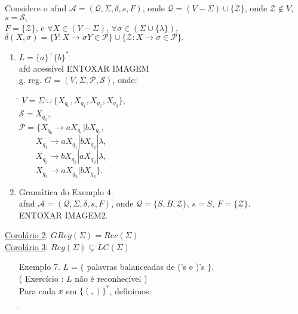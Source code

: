 \documentclass{article}
\newcommand{\gram}[1]{G_{#1} = (V_{#1},\Sigma,\mathcal{P}_{#1},\mathcal{S})}
\newcommand{\afnd}{\mathcal{A} = (\mathcal{Q},\Sigma, \delta, s, F)}
\begin{document}
    Considere o afnd $\afnd$, onde $ \mathcal{Q} = (V-\Sigma) \cup \{\mathcal{Z}\}$, onde $ \mathcal{Z} \notin V $, \\
    $ s = \mathcal{S}, $ \\
    $ F = \{\mathcal{Z}\} $,
    e $ \forall X \in (V-\Sigma)$, $ \forall \sigma \in ( \Sigma \cup \{\lambda\} )$, \\
    $ \delta(X, \sigma ) =  \{ Y: X \rightarrow \sigma Y \in \mathcal{P} \} \cup 
                            \{ \mathcal{Z} : X \rightarrow \sigma \in \mathcal{P} \}. $  
    \begin{enumerate}
        \item $ L = \{a\}^+\{b\}^* $ \\
            afd acessível ENTOXAR IMAGEM \\
            g. reg. $\gram{}$, onde:
            \begin{tabbing}
                \hspace{1cm}\= $ V = \Sigma \cup \{ X_{q_0},X_{q_1},X_{q_2},X_{q_3} \}$, \\
                            \> $ \mathcal{S} = X_{q_0} $, \\
                            \> $ \mathcal{P} = \{ X_{q_0} \rightarrow aX_{q_1} | bX_{q_3}$, \\
                            \> $ \qquad X_{q_1} \rightarrow aX_{q_1} | bX_{q_2} | \lambda$, \\
                            \> $ \qquad X_{q_2} \rightarrow bX_{q_2} | aX_{q_3} | \lambda$, \\
                            \> $ \qquad X_{q_3} \rightarrow aX_{q_3} | bX_{q_3} \} $.
            \end{tabbing}
        \item   Gramática do Exemplo 4. \\
                afnd $\afnd$, onde $ \mathcal{Q} = \{ S, B, \mathcal{Z} \} $, $ s = S $, $ F = \{\mathcal{Z}\} $. \\
                ENTOXAR IMAGEM2.\\
    \end{enumerate}
    \underline{Corolário 2}: $ GReg(\Sigma) = Rec(\Sigma) $\\
    \underline{Corolário 3}: $ Reg(\Sigma) \subsetneq LC(\Sigma) $\\
    \begin{enumerate}
        \item [Exemplo 7.] $ L = \{ $ palavras balanceadas de ('s e )'s $ \} $. \\
        ( Exercício : $L$ não é reconhecível )\\
        Para cada $x$ em $ \{ (, ) \} ^* $, definimos:
        \begin{tabbing}
            \hspace{0.5cm}  \=
        \end{tabbing}    
    \end{enumerate}
\end{document}
